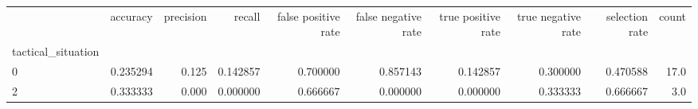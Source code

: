 \begin{tabular}{lrrrrrrrrr}
\toprule
{} &  accuracy &  precision &    recall &  false positive rate &  false negative rate &  true positive rate &  true negative rate &  selection rate &  count \\
tactical\_situation &           &            &           &                      &                      &                     &                     &                 &        \\
\midrule
0                  &  0.235294 &      0.125 &  0.142857 &             0.700000 &             0.857143 &            0.142857 &            0.300000 &        0.470588 &   17.0 \\
2                  &  0.333333 &      0.000 &  0.000000 &             0.666667 &             0.000000 &            0.000000 &            0.333333 &        0.666667 &    3.0 \\
\bottomrule
\end{tabular}
